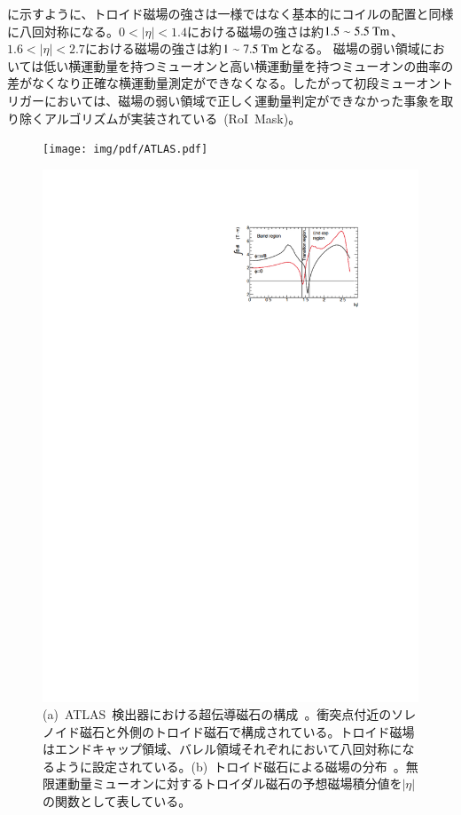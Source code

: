 に示すように、トロイド磁場の強さは一様ではなく基本的にコイルの配置と同様に八回対称になる。$0<|\eta|<1.4$における磁場の強さは約$1.5\sim5.5~\rm{Tm}$、$1.6<|\eta|<2.7$における磁場の強さは約$1\sim7.5~\rm{Tm}$となる。
磁場の弱い領域においては低い横運動量を持つミューオンと高い横運動量を持つミューオンの曲率の差がなくなり正確な横運動量測定ができなくなる。したがって初段ミューオントリガーにおいては、磁場の弱い領域で正しく運動量判定ができなかった事象を取り除くアルゴリズムが実装されている~(RoI~Mask)。
\begin{figure}[tbp]
        \begin{minipage}{0.49\hsize}
        \centering   
        \texttt{[image: img/pdf/ATLAS.pdf]}
        \subcaption{}
        \end{minipage}
        \begin{minipage}{0.49\hsize}
	    \centering
	    \includegraphics[width=\textwidth,page=1]{img/pdf/mag.pdf}
	    \subcaption{}
	    \end{minipage}
        \caption[ATLAS~検出器における超伝導磁石の構成とトロイド磁石による磁場の分布]{(a)~ATLAS~検出器における超伝導磁石の構成~\cite{TR:01}。衝突点付近のソレノイド磁石と外側のトロイド磁石で構成されている。トロイド磁場はエンドキャップ領域、バレル領域それぞれにおいて八回対称になるように設定されている。(b)~トロイド磁石による磁場の分布~\cite{TR:01}。無限運動量ミューオンに対するトロイダル磁石の予想磁場積分値を$|\eta|$の関数として表している。}\label{fig:mag}
\end{figure}

